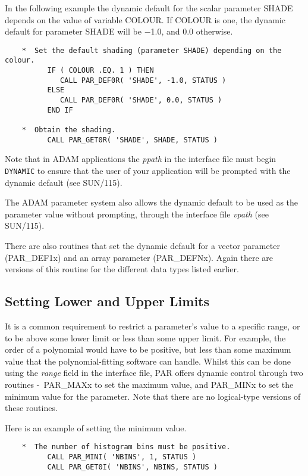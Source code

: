 \documentclass[twoside,11pt]{article}
\newcommand{\xref}[3]{#1}
\newcommand{\xlabel}[1]{}
\newcommand{\dash}{--}
\renewcommand{\dash}{-}
\begin{document}
In the following example the dynamic default for the scalar parameter
SHADE depends on the value of variable COLOUR.  If COLOUR is one, the
dynamic default for parameter SHADE will be $-$1.0, and 0.0 otherwise. 

\begin{verbatim}
    *  Set the default shading (parameter SHADE) depending on the colour.
          IF ( COLOUR .EQ. 1 ) THEN
             CALL PAR_DEF0R( 'SHADE', -1.0, STATUS )
          ELSE
             CALL PAR_DEF0R( 'SHADE', 0.0, STATUS )
          END IF

    *  Obtain the shading.
          CALL PAR_GET0R( 'SHADE', SHADE, STATUS )
\end{verbatim}


Note that in {\footnotesize ADAM} applications the {\em ppath\/} in the
interface file must begin {\tt DYNAMIC} to ensure that the user of your
application will be prompted with the dynamic default (see 
\xref{SUN/115}{sun115}{the_ppath_field}).

The {\footnotesize ADAM} parameter system also allows the dynamic 
default to be used as the parameter value without prompting, through 
the interface file {\em vpath\/} (see 
\xref{SUN/115}{sun115}{the_vpath_field}).


There are also routines that set the dynamic default for a vector
parameter (PAR\_DEF1x) and an array parameter (PAR\_DEFNx).   Again
there are versions of this routine for the different data types listed
earlier. 

\subsection{\xlabel{setting_lower_and_upper_limits}Setting Lower and Upper Limits} 

It is a common requirement to restrict a parameter's value to a specific
range, or to be above some lower limit or less than some upper limit. 
For example, the order of a polynomial would have to be positive, but
less than some maximum value that the polynomial-fitting software can
handle.  Whilst this can be done using the {\em range\/} field in the
interface file, PAR offers dynamic control through two
routines \dash\ PAR\_MAXx to set the maximum value, and PAR\_MINx to set the
minimum value for the parameter.  Note that there are no logical-type
versions of these routines. 

Here is an example of setting the minimum value.

\begin{verbatim}
    *  The number of histogram bins must be positive.
          CALL PAR_MINI( 'NBINS', 1, STATUS )
          CALL PAR_GET0I( 'NBINS', NBINS, STATUS )
\end{verbatim}
\end{document}
